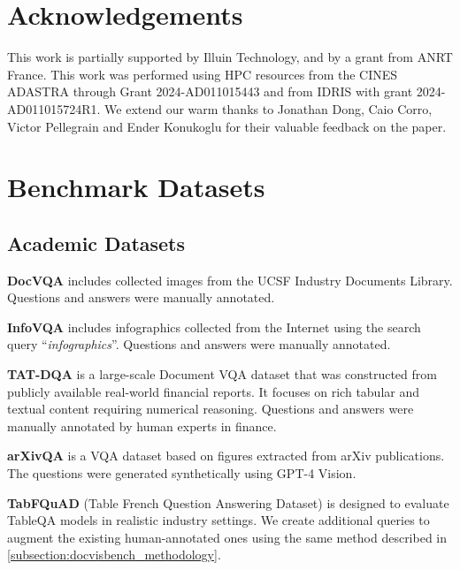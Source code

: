 \documentclass{article} %
\begin{document}
\section*{Acknowledgements}

This work is partially supported by Illuin Technology, and by a grant from ANRT France. This work was performed using HPC resources from the CINES ADASTRA through Grant 2024-AD011015443 and from IDRIS with grant 2024-AD011015724R1.
We extend our warm thanks to Jonathan Dong, Caio Corro, Victor Pellegrain and Ender Konukoglu for their valuable feedback on the paper.









\appendix
\label{appendix}


\section{Benchmark Datasets}

\subsection{Academic Datasets}
\label{subsection:academic_datasets}

\noindent\textbf{DocVQA} \citep{mathew_docvqa_2020} includes collected images from the UCSF Industry Documents Library. Questions and answers were manually annotated.

\noindent\textbf{InfoVQA} \citep{mathew_infographicvqa_2021} includes infographics collected from the Internet using the search query “\textit{infographics}”. Questions and answers were manually annotated.

\noindent\textbf{TAT-DQA} \citep{zhu_towards_2022} is a large-scale Document VQA dataset that was constructed from publicly available real-world financial reports. It focuses on rich tabular and textual content requiring numerical reasoning. Questions and answers were manually annotated by human experts in finance.

\noindent\textbf{arXivQA} \citep{li2024multimodal} is a VQA dataset based on figures extracted from arXiv publications. The questions were generated synthetically using GPT-4 Vision.

\noindent\textbf{TabFQuAD} (Table French Question Answering Dataset) is designed to evaluate TableQA models in realistic industry settings. We create additional queries to augment the existing human-annotated ones using the same method described in \autoref{subsection:docvisbench_methodology}.
\end{document}
